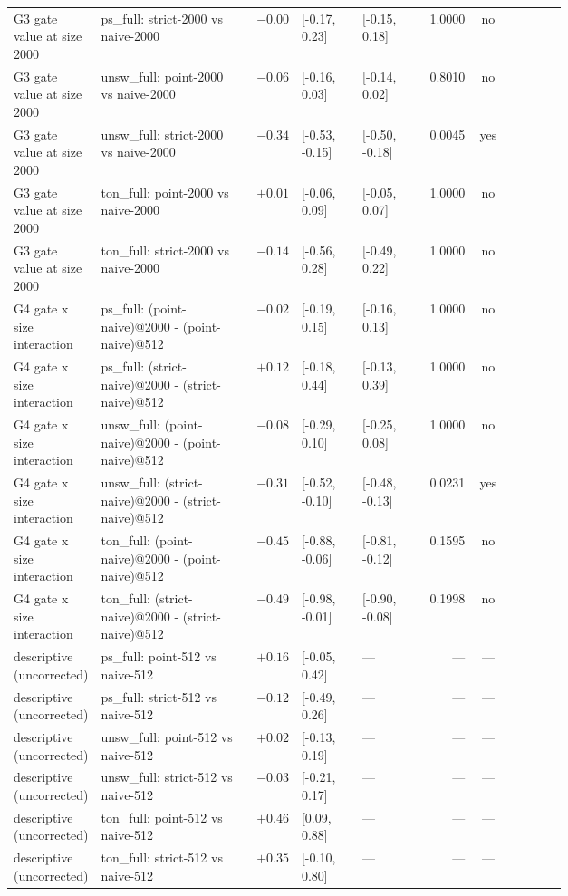 {\begin{longtable}{p{0.12\linewidth} p{0.27\linewidth} r p{0.11\linewidth} p{0.11\linewidth} r c p{0.10\linewidth}}
G3 gate value at size 2000 & ps\_full: strict-2000 vs naive-2000 & $-0.00$ & [-0.17, 0.23] & [-0.15, 0.18] & 1.0000 & no &  \\
G3 gate value at size 2000 & unsw\_full: point-2000 vs naive-2000 & $-0.06$ & [-0.16, 0.03] & [-0.14, 0.02] & 0.8010 & no &  \\
G3 gate value at size 2000 & unsw\_full: strict-2000 vs naive-2000 & $-0.34$ & [-0.53, -0.15] & [-0.50, -0.18] & 0.0045 & yes &  \\
G3 gate value at size 2000 & ton\_full: point-2000 vs naive-2000 & $+0.01$ & [-0.06, 0.09] & [-0.05, 0.07] & 1.0000 & no &  \\
G3 gate value at size 2000 & ton\_full: strict-2000 vs naive-2000 & $-0.14$ & [-0.56, 0.28] & [-0.49, 0.22] & 1.0000 & no &  \\
G4 gate x size interaction & ps\_full: (point-naive)@2000 - (point-naive)@512 & $-0.02$ & [-0.19, 0.15] & [-0.16, 0.13] & 1.0000 & no &  \\
G4 gate x size interaction & ps\_full: (strict-naive)@2000 - (strict-naive)@512 & $+0.12$ & [-0.18, 0.44] & [-0.13, 0.39] & 1.0000 & no &  \\
G4 gate x size interaction & unsw\_full: (point-naive)@2000 - (point-naive)@512 & $-0.08$ & [-0.29, 0.10] & [-0.25, 0.08] & 1.0000 & no &  \\
G4 gate x size interaction & unsw\_full: (strict-naive)@2000 - (strict-naive)@512 & $-0.31$ & [-0.52, -0.10] & [-0.48, -0.13] & 0.0231 & yes &  \\
G4 gate x size interaction & ton\_full: (point-naive)@2000 - (point-naive)@512 & $-0.45$ & [-0.88, -0.06] & [-0.81, -0.12] & 0.1595 & no &  \\
G4 gate x size interaction & ton\_full: (strict-naive)@2000 - (strict-naive)@512 & $-0.49$ & [-0.98, -0.01] & [-0.90, -0.08] & 0.1998 & no &  \\
descriptive (uncorrected) & ps\_full: point-512 vs naive-512 & $+0.16$ & [-0.05, 0.42] & --- & --- & --- &  \\
descriptive (uncorrected) & ps\_full: strict-512 vs naive-512 & $-0.12$ & [-0.49, 0.26] & --- & --- & --- &  \\
descriptive (uncorrected) & unsw\_full: point-512 vs naive-512 & $+0.02$ & [-0.13, 0.19] & --- & --- & --- &  \\
descriptive (uncorrected) & unsw\_full: strict-512 vs naive-512 & $-0.03$ & [-0.21, 0.17] & --- & --- & --- &  \\
descriptive (uncorrected) & ton\_full: point-512 vs naive-512 & $+0.46$ & [0.09, 0.88] & --- & --- & --- &  \\
descriptive (uncorrected) & ton\_full: strict-512 vs naive-512 & $+0.35$ & [-0.10, 0.80] & --- & --- & --- &  \\
\bottomrule
\end{longtable}
}
